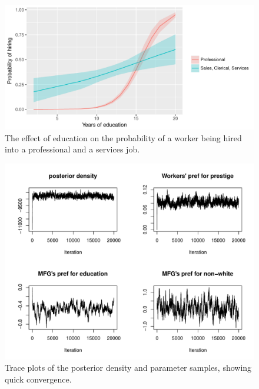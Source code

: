 \begin{figure}[!ht]
  \centering \includegraphics[width=\textwidth,keepaspectratio]{../figure/labor_occ5_educ_effect_on_hiring}
  \caption[The effect of education on the probability of a worker being hired in
  the US labor market.]{The
    effect of education on the probability of a worker being hired into a professional
    and a services job.}
  \label{fig:labor_occ5_educ_effect_on_hiring}
\end{figure}

\begin{figure}[!ht]
  \centering
  \includegraphics[width=\textwidth,keepaspectratio]{../figure/labor_occ5_misc_traceplots}
  \caption[Parameter traceplots]{Trace plots of the posterior density and
    parameter samples, showing quick convergence.}
  \label{fig:labor_occ5_misc_traceplots}
\end{figure}

